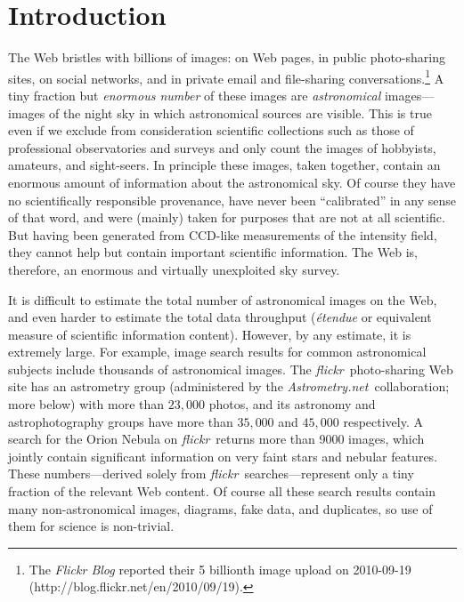 \documentclass[12pt,preprint]{aastex}
\newcommand{\project}[1]{\textsl{#1}}
\newcommand{\An}{\project{Astrometry.net}}
\newcommand{\flickr}{\project{flickr}}
\newcommand{\foreign}[1]{\emph{#1}}
\newcommand{\thou}{,\!000}
\begin{document}
\section{Introduction}

The Web bristles with billions of images: on Web pages, in public
photo-sharing sites, on social networks, and in private email and
file-sharing conversations.\footnote{The \emph{Flickr Blog} reported
  their 5 billionth image upload on 2010-09-19
  (http://blog.flickr.net/en/2010/09/19).} A tiny fraction but
\emph{enormous number} of these images are \emph{astronomical}
images---images of the night sky in which astronomical sources are
visible.  This is true even if we exclude from consideration
scientific collections such as those of professional observatories and
surveys and only count the images of hobbyists, amateurs, and
sight-seers.  In principle these images, taken together, contain an
enormous amount of information about the astronomical sky.  Of course
they have no scientifically responsible provenance, have never been
``calibrated'' in any sense of that word, and were (mainly) taken for
purposes that are not at all scientific.  But having been generated
from CCD-like measurements of the intensity field, they cannot help
but contain important scientific information.  The Web is, therefore,
an enormous and virtually unexploited sky survey.

It is difficult to estimate the total number of astronomical images on
the Web, and even harder to estimate the total data throughput
(\foreign{\'etendue} or equivalent measure of scientific information
content).  However, by any estimate, it is extremely large.  For
example, image search results for common astronomical subjects include
thousands of astronomical images.  The \flickr\ photo-sharing Web site
has an astrometry group (administered by the \An\ collaboration; more
below) with more than $23\thou$ photos, and its astronomy and
astrophotography groups have more than $35\thou$ and $45\thou$
respectively.  A search for the Orion Nebula on \flickr\ returns more
than 9000 images, which jointly contain significant information on
very faint stars and nebular features.  These numbers---derived solely
from \flickr\ searches---represent only a tiny fraction of the
relevant Web content.  Of course all these search results contain many
non-astronomical images, diagrams, fake data, and duplicates, so use
of them for science is non-trivial.
\end{document}
